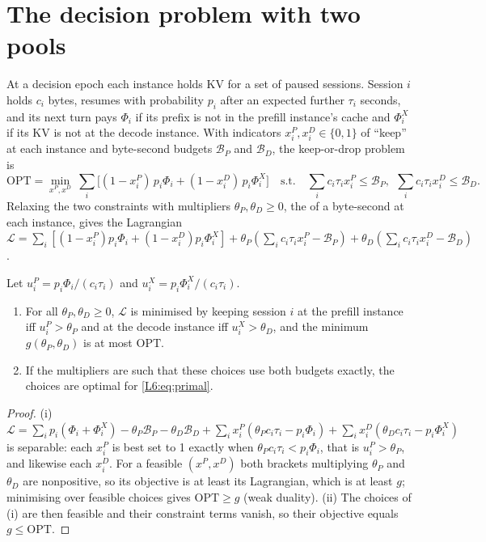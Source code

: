 \section{The decision problem with two pools}\label{L6:sec:decision}

At a decision epoch each instance holds KV for a set of paused sessions. Session $i$
holds $c_i$ bytes, resumes with probability $p_i$ after an expected further $\tau_i$
seconds, and its next turn pays $\Phi_i$ if its prefix is not in the prefill instance's
cache and $\Phi^X_i$ if its KV is not at the decode instance. With indicators
$x^P_i,x^D_i\in\{0,1\}$ of ``keep'' at each instance and byte-second budgets $\mathcal B_P$ and
$\mathcal B_D$, the keep-or-drop problem is
\begin{equation}\label{L6:eq:primal}
  \mathrm{OPT}=\min_{x^P,x^D}\ \sum_i\bigl[(1-x^P_i)\,p_i\Phi_i+(1-x^D_i)\,p_i\Phi^X_i\bigr]
  \quad\text{s.t.}\quad \sum_ic_i\tau_ix^P_i\le \mathcal B_P,\ \ \sum_ic_i\tau_ix^D_i\le \mathcal B_D .
\end{equation}
Relaxing the two constraints with multipliers $\theta_P,\theta_D\ge0$, the
 of a byte-second at each instance, gives the Lagrangian
$\mathcal{L}=\sum_i[(1-x^P_i)p_i\Phi_i+(1-x^D_i)p_i\Phi^X_i]
+\theta_P(\sum_ic_i\tau_ix^P_i-\mathcal B_P)+\theta_D(\sum_ic_i\tau_ix^D_i-\mathcal B_D)$.

\begin{proposition}\label{L6:prop:shadow}
Let $u^P_i=p_i\Phi_i/(c_i\tau_i)$ and $u^X_i=p_i\Phi^X_i/(c_i\tau_i)$.
\begin{enumerate}[label=(\roman*)]
\item For all $\theta_P,\theta_D\ge0$, $\mathcal{L}$ is minimised by keeping session $i$ at
  the prefill instance iff $u^P_i>\theta_P$ and at the decode instance iff
  $u^X_i>\theta_D$, and the minimum $g(\theta_P,\theta_D)$ is at most $\mathrm{OPT}$.
\item If the multipliers are such that these choices use both budgets exactly, the
  choices are optimal for \eqref{L6:eq:primal}.
\end{enumerate}
\end{proposition}

\begin{proof}
(i) $\mathcal{L}=\sum_ip_i(\Phi_i+\Phi^X_i)-\theta_P\mathcal B_P-\theta_D\mathcal B_D
+\sum_ix^P_i(\theta_Pc_i\tau_i-p_i\Phi_i)+\sum_ix^D_i(\theta_Dc_i\tau_i-p_i\Phi^X_i)$ is
separable: each $x^P_i$ is best set to 1 exactly when $\theta_Pc_i\tau_i<p_i\Phi_i$, that
is $u^P_i>\theta_P$, and likewise each $x^D_i$. For a feasible $(x^P,x^D)$ both brackets
multiplying $\theta_P$ and $\theta_D$ are nonpositive, so its objective is at least its
Lagrangian, which is at least $g$; minimising over feasible choices gives
$\mathrm{OPT}\ge g$ (weak duality). (ii) The choices of (i) are then feasible and their
constraint terms vanish, so their objective equals $g\le\mathrm{OPT}$.
\end{proof}

